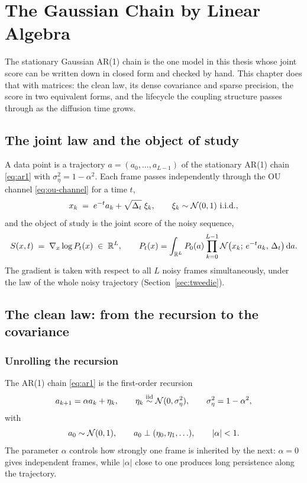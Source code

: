 \chapter{The Gaussian Chain by Linear Algebra}\label{ch:gaussian}

The stationary Gaussian AR(1) chain is the one model in this thesis whose joint
score can be written down in closed form and checked by hand. This chapter does
that with matrices: the clean law, its dense covariance and sparse precision,
the score in two equivalent forms, and the lifecycle the coupling structure
passes through as the diffusion time grows. 

\section{The joint law and the object of study}\label{sec:g-model}

A data point is a trajectory $a = (a_0, \dots, a_{L-1})$ of the stationary
AR(1) chain \eqref{eq:ar1} with $\sigma_\eta^2 = 1 - \alpha^2$. Each frame
passes independently through the OU channel \eqref{eq:ou-channel} for a
time $t$,
\begin{equation}
  x_k \;=\; e^{-t} a_k + \sqrt{\Delta_t}\;\xi_k,
  \qquad \xi_k \sim \mathcal{N}(0,1)\ \text{i.i.d.},
  \label{eq:g-channel}
\end{equation}
and the object of study is the joint score of the noisy sequence,
\begin{equation}
  S(x, t) \;=\; \nabla_x \log P_t(x) \;\in\; \mathbb{R}^L,
  \qquad
  P_t(x) = \int_{\mathbb{R}^L} P_0(a) \prod_{k=0}^{L-1}
    \mathcal{N}\big(x_k;\, e^{-t}a_k,\, \Delta_t\big)\, \mathrm{d} a .
  \label{eq:g-object}
\end{equation}
The gradient is taken with respect to all $L$ noisy frames simultaneously,
under the law of the whole noisy trajectory
(Section~\ref{sec:tweedie}).

\section{The clean law: from the recursion to the covariance}
\label{sec:g-clean}

\subsection{Unrolling the recursion}

The AR(1) chain \eqref{eq:ar1} is the first-order recursion
\begin{equation}
  a_{k+1}
  = \alpha a_k + \eta_k,
  \qquad
  \eta_k \stackrel{\mathrm{iid}}{\sim} \mathcal{N}(0,\sigma_\eta^2),
  \qquad
  \sigma_\eta^2 = 1-\alpha^2,
  \label{eq:g-recursion}
\end{equation}
with
\[
  a_0\sim\mathcal{N}(0,1),
  \qquad
  a_0 \perp (\eta_0,\eta_1,\ldots),
  \qquad
  |\alpha|<1.
\]
The parameter $\alpha$ controls how strongly one frame is inherited by the
next: $\alpha=0$ gives independent frames, while $|\alpha|$ close to one
produces long persistence along the trajectory.

